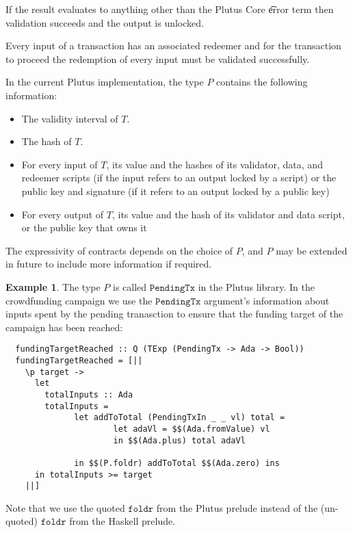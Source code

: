 \documentclass[a4paper]{article}
\theoremstyle{definition}  %
\newtheorem{example}{Example}
\begin{document}
If the result evaluates to anything other than the Plutus Core
\t{error} term then validation succeeds and the output is unlocked.

Every input of a transaction has an associated redeemer and for the
transaction to proceed the redemption of every input must be validated
successfully.

In the current Plutus implementation, the type $P$ contains the
following information:

\begin{itemize}
\item The validity interval of $T$.
\item The hash of $T$.
\item For every input of $T$, its value and the hashes of its
  validator, data, and redeemer scripts (if the input refers to an output locked by a script) or the public key and signature (if it refers to an output locked by a public key)
\item For every output of $T$, its value and the hash of its validator
  and data script, or the public key that owns it
\end{itemize}

The expressivity of contracts depends on the choice of $P$, and $P$
may be extended in future to include more information if required.

\begin{example} The type $P$ is called $\mathtt{PendingTx}$ in the Plutus 
library. In the crowdfunding campaign we use the $\mathtt{PendingTx}$ 
argument's information about inputs spent by the pending tranasction to ensure 
that the funding target of the campaign has been reached:

\begin{verbatim}
  fundingTargetReached :: Q (TExp (PendingTx -> Ada -> Bool))
  fundingTargetReached = [|| 
    \p target -> 
      let
        totalInputs :: Ada
        totalInputs =
              let addToTotal (PendingTxIn _ _ vl) total = 
                      let adaVl = $$(Ada.fromValue) vl 
                      in $$(Ada.plus) total adaVl

              in $$(P.foldr) addToTotal $$(Ada.zero) ins
      in totalInputs >= target
    ||]
\end{verbatim}

Note that we use the quoted $\mathtt{foldr}$ from the Plutus prelude instead of the (un-quoted) $\mathtt{foldr}$ from the Haskell prelude. 

\end{example}
\end{document}
